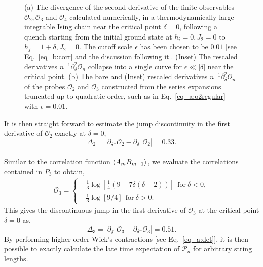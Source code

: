 \documentclass[aps,prx,twocolumn]{revtex4-2}
\begin{document}
{{\begin{figure*}
	\caption{(a) The divergence of the second derivative of the finite observables $\mathcal{O}_2,\mathcal{O}_3$ and $\mathcal{O}_4$ calculated numerically, in a thermodynamically large integrable Ising chain near the critical point $\delta=0$, following a quench starting from the initial ground state at $h_i=0,J_2=0$ to $h_f=1+\delta,J_2=0$. The cutoff scale $\epsilon$ has been chosen to be $0.01$ [see Eq.~\eqref{eq_b:corr} and the discussion following it]. (Inset) The rescaled derivatives $n^{-1}\partial_{\delta}^2\mathcal{O}_n$ collapse into a single curve for $\epsilon\ll|\delta|$ near the critical point. (b) The bare and (Inset) rescaled derivatives $n^{-1}\partial_{\delta}^2\mathcal{O}_n$ of the probes  $\mathcal{O}_2$ and $\mathcal{O}_3$ constructed from the series expansions truncated up to quadratic order, such as in Eq.~\eqref{eq_a:o2regular} with $\epsilon=0.01$.}
\end{figure*}
It is then straight forward to estimate the jump discontinuity in the first derivative of $\mathcal{O}_2$ exactly at $\delta=0$,
\begin{equation}\label{eq:bdelta2}
	\Delta_2=|\partial_{\delta^+}\mathcal{O}_2-\partial_{\delta^-}\mathcal{O}_2|= 0.33.
\end{equation}\\

Similar to the correlation function $\braket{A_mB_{m-1}}$, we evaluate the correlations contained in $P_3$ to obtain,
\begin{eqnarray}
	\mathcal{O}_3=
	\begin{cases}
		-\frac{1}{3}\log\left[\frac{1}{4} (9-7 \delta  (\delta +2))\right]~~\text{for}~\delta<0,\\
		-\frac{1}{3}\log\left[9/4\right]~~\text{for}~\delta>0.
	\end{cases}
\end{eqnarray}
This gives the discontinuous jump in the first derivative of $\mathcal{O}_3$ at the critical point $\delta=0$ as,
\begin{equation}\label{eq:bdelta3}
	\Delta_3=|\partial_{\delta^+}\mathcal{O}_3-\partial_{\delta^-}\mathcal{O}_3|= 0.51.
\end{equation}
 By performing higher order Wick's contractions [see Eq.~\eqref{eq_a:det}], it is then  possible to exactly calculate the late time expectation of $\mathcal{P}_n$ for arbitrary string lengths.\\
 
}}
\end{document}
